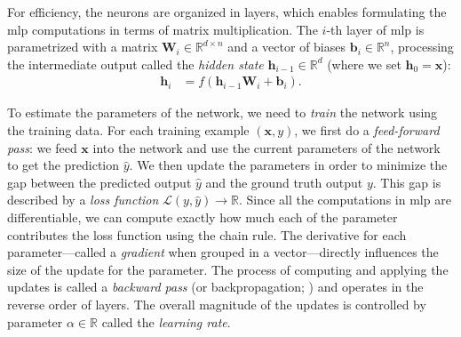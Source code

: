 For efficiency, the neurons are organized in layers, which enables formulating the \ac{mlp} computations in terms of matrix multiplication. The $i$-th layer of \ac{mlp} is parametrized with a matrix $\mathbf{W}_i \in \mathbb{R}^{d\times n}$ and a vector of biases $\mathbf{b}_i \in \mathbb{R}^{n}$, processing the intermediate output called the \textit{hidden state} $\mathbf{h}_{i-1} \in \mathbb{R}^{d}$ (where we set $\textbf{h}_0 = \textbf{x}$):
\begin{align}
  \mathbf{h}_i & = f(\mathbf{h}_{i-1} \mathbf{W}_i + \mathbf{b}_i).
\end{align}

To estimate the parameters of the network, we need to \emph{train} the network using the training data. For each training example $(\mathbf{x}, y)$, we first do a \emph{feed-forward pass}: we feed $\mathbf{x}$ into the network and use the current parameters of the network to get the prediction $\hat{y}$. We then update the parameters in order to minimize the gap between the predicted output $\hat{y}$ and the ground truth output $y$. This gap is described by a \textit{loss function} $\mathcal{L}(y, \hat{y}) \rightarrow \mathbb{R}$.
Since all the computations in \ac{mlp} are differentiable, we can compute exactly how much each of the parameter contributes the loss function using the chain rule. The derivative for each parameter---called a \emph{gradient} when grouped in a vector---directly influences the size of the update for the parameter. The process of computing and applying the updates is called a \emph{backward pass} (or backpropagation; \citealp{kelley1960gradient,rumelhart1986learning}) and operates in the reverse order of layers. The overall magnitude of the updates is controlled by parameter $\alpha \in \mathbb{R}$ called the \emph{learning rate}.


